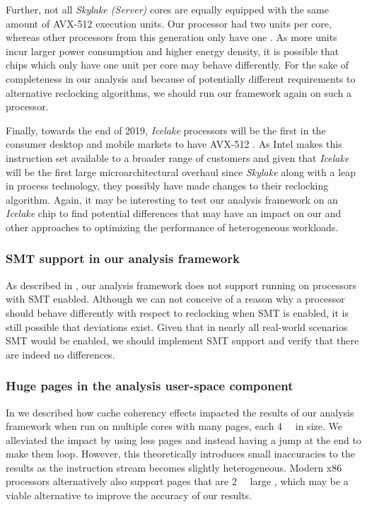 Further, not all \textit{Skylake (Server)} cores are equally equipped with the same amount of \gls{AVX-512} execution units. Our processor had two units per core, whereas other processors from this generation only have one \cite{intelxeonscalabledeepdive}. As more units incur larger power consumption and higher energy density, it is possible that chips which only have one unit per core may behave differently. For the sake of completeness in our analysis and because of potentially different requirements to alternative reclocking algorithms, we should run our framework again on such a processor.

Finally, towards the end of 2019, \textit{Icelake} processors will be the first in the consumer desktop and mobile markets to have \gls{AVX-512} \cite{thicelake}. As Intel makes this instruction set available to a broader range of customers and given that \textit{Icelake} will be the first large microarchitectural overhaul since \textit{Skylake} along with a leap in process technology, they possibly have made changes to their reclocking algorithm. Again, it may be interesting to test our analysis framework on an \textit{Icelake} chip to find potential differences that may have an impact on our and other approaches to optimizing the performance of heterogeneous workloads.

\subsubsection{SMT support in our analysis framework}
\label{sec:conclusion:futurework:smt}

As described in , our analysis framework does not support running on processors with \gls{SMT} enabled. Although we can not conceive of a reason why a processor should behave differently with respect to reclocking when \gls{SMT} is enabled, it is still possible that deviations exist. Given that in nearly all real-world scenarios \gls{SMT} would be enabled, we should implement \gls{SMT} support and verify that there are indeed no differences.

\subsubsection{Huge pages in the analysis user-space component}
\label{sec:conclusion:futurework:hugepages}

In  we described how cache coherency effects impacted the results of our analysis framework when run on multiple cores with many pages, each \SI{4}{\kibi\byte} in size. We alleviated the impact by using less pages and instead having a jump at the end to make them loop. However, this theoretically introduces small inaccuracies to the results as the instruction stream becomes slightly heterogeneous. Modern x86 processors alternatively also support pages that are \SI{2}{\mebi\byte} large \cite{intelsdmsysprogguide}, which may be a viable alternative to improve the accuracy of our results.

